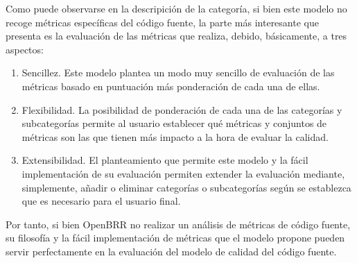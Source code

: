 \documentclass[11pt]{article}
\begin{document}
\begin{itemize}
Como puede observarse en la descripición de la categoría, si bien este modelo no recoge métricas específicas del código fuente, la parte más interesante que presenta es la evaluación de las métricas que realiza, debido, básicamente, a tres aspectos:
\begin{enumerate}
\item{Sencillez}. Este modelo plantea un modo muy sencillo de evaluación de las métricas basado en puntuación más ponderación de cada una de ellas.
\item{Flexibilidad}. La posibilidad de ponderación de cada una de las categorías y subcategorías permite al usuario establecer qué métricas y conjuntos de métricas son las que tienen más impacto a la hora de evaluar la calidad.
\item{Extensibilidad}. El planteamiento que permite este modelo y la fácil implementación de su evaluación permiten extender la evaluación mediante, simplemente, añadir o eliminar categorías o subcategorías según se establezca que es necesario para el usuario final.
\end{enumerate}

Por tanto, si bien OpenBRR no realizar un análisis de métricas de código fuente, su filosofía y la fácil implementación de métricas que el modelo propone pueden servir perfectamente en la evaluación del modelo de calidad del código fuente.


\end{itemize}
\end{document}

